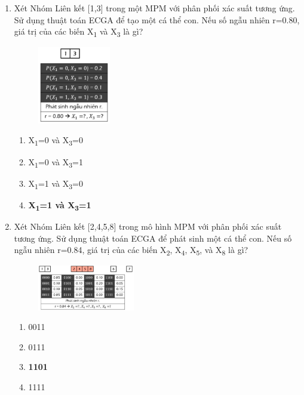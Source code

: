 \documentclass{book}
\begin{document}
\begin{enumerate}
    \item Xét Nhóm Liên kết [1,3] trong một MPM với phân phối xác suất tương ứng. Sử dụng thuật toán ECGA để tạo một cá thể con. Nếu số ngẫu nhiên r=0.80, giá trị của các biến X\textsubscript{1} và X\textsubscript{3} là gì?
    \begin{figure}[H]
        \centering
        \includegraphics[width=0.3\textwidth]{images/quiz5_9.png}
    \end{figure}
    \begin{multicols}{2}
        \begin{enumerate}[label=\Alph*]
            \item X\textsubscript{1}=0 và X\textsubscript{3}=0
            \item X\textsubscript{1}=0 và X\textsubscript{3}=1
            \item X\textsubscript{1}=1 và X\textsubscript{3}=0
            \item \textbf{X\textsubscript{1}=1 và X\textsubscript{3}=1}
        \end{enumerate}
    \end{multicols}

    \item Xét Nhóm Liên kết [2,4,5,8] trong mô hình MPM với phân phối xác suất tương ứng. Sử dụng thuật toán ECGA để phát sinh một cá thể con. Nếu số ngẫu nhiên r=0.84, giá trị của các biến X\textsubscript{2}, X\textsubscript{4}, X\textsubscript{5}, và X\textsubscript{8} là gì?
    \begin{figure}[H]
        \centering
        \includegraphics[width=0.4\textwidth]{images/quiz5_10.png}
    \end{figure}
    \begin{multicols}{2}
        \begin{enumerate}[label=\Alph*]
            \item 0011
            \item 0111
            \item \textbf{1101}
            \item 1111
        \end{enumerate}
    \end{multicols}

\end{enumerate}
\end{document}
